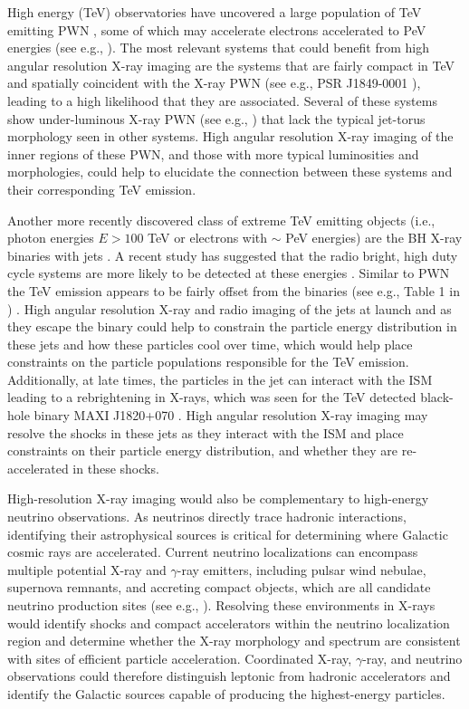 \documentclass{article}
\begin{document}
High energy (TeV) observatories have uncovered a large population of TeV emitting PWN \cite{2018A&A...612A...2H}, some of which may accelerate electrons accelerated to PeV energies (see e.g., \citealt{2026ApJ...998..230B}). The most relevant systems that could benefit from high angular resolution X-ray imaging are the systems that are fairly compact in TeV and spatially coincident with the X-ray PWN (see e.g., PSR J1849-0001 \cite{2024ApJ...968...67G}), leading to a high likelihood that they are associated. Several of these systems show under-luminous X-ray PWN (see e.g., \cite{2013uean.book..359K}) that lack the typical jet-torus morphology seen in other systems. High angular resolution X-ray imaging of the inner regions of these PWN, and those with more typical luminosities and morphologies, could help to elucidate the connection between these systems and their corresponding TeV emission. 

Another more recently discovered class of extreme  TeV emitting objects (i.e., photon energies $E>100$ TeV or electrons with $\sim$ PeV energies) are the BH X-ray binaries with jets \cite{2025NSRev..12af496L}. A recent study has suggested that the radio bright, high duty cycle systems are more likely to be detected at these energies \cite{2026arXiv260706360O}. Similar to PWN the TeV emission appears to be fairly offset from the binaries (see e.g., Table 1 in \cite{2026arXiv260706360O}) . High angular resolution X-ray and radio imaging of the jets at launch and as they escape the binary could help to constrain the particle energy distribution in these jets and how these particles cool over time, which would help place constraints on the particle populations responsible for the TeV emission. Additionally, at late times, the particles in the jet can interact with the ISM leading to a rebrightening in X-rays, which was seen for the TeV detected black-hole binary MAXI J1820+070 \cite{2020ApJ...895L..31E}. High angular resolution X-ray imaging may resolve the shocks in these jets as they interact with the ISM and place constraints on their particle energy distribution, and whether they are re-accelerated in these shocks.

High-resolution X-ray imaging would also be complementary to high-energy neutrino observations. As neutrinos directly trace hadronic interactions, identifying their astrophysical sources is critical for determining where Galactic cosmic rays are accelerated. Current neutrino localizations can encompass multiple potential X-ray and $\gamma$-ray emitters, including pulsar wind nebulae, supernova remnants, and accreting compact objects, which are all candidate neutrino production sites (see e.g., \cite{2017ApJ...836..159D,2007ApJ...665L.131G,2003ApJ...589..481A}). Resolving these environments in X-rays would identify shocks and compact accelerators within the neutrino localization region and determine whether the X-ray morphology and spectrum are consistent with sites of efficient particle acceleration. Coordinated X-ray, $\gamma$-ray, and neutrino observations could therefore distinguish leptonic from hadronic accelerators and identify the Galactic sources capable of producing the highest-energy particles.
\end{document}
